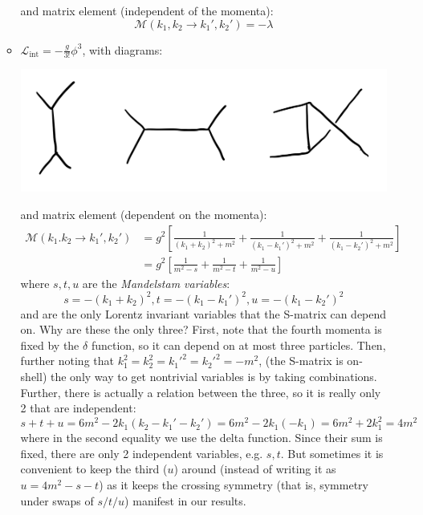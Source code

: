 \begin{itemize}
\begin{itemize}
\begin{center}
        \end{center}
        and matrix element (independent of the momenta):
        \begin{equation}
            \mathcal{M}(k_1, k_2 \to k_1', k_2') = -\lambda
        \end{equation}
        \item $\mathcal{L}_{\text{int}} = -\frac{g}{3!}\phi^3$, with diagrams:
        \begin{center}
            \includegraphics[scale=0.4]{Lectures/Figures/lec18-Ogsquared.png}
        \end{center}
        and matrix element (dependent on the momenta):
        \begin{equation}
            \begin{split}
                \mathcal{M}(k_1. k_2 \to k_1', k_2') &= g^2\left[\frac{1}{(k_1 + k_2)^2 + m^2} + \frac{1}{(k_1 - k_1')^2 + m^2} + \frac{1}{(k_1 - k_2')^2 + m^2}\right] 
                \\ &= g^2\left[\frac{1}{m^2 - s} + \frac{1}{m^2 - t} + \frac{1}{m^2 - u}\right]
            \end{split}
        \end{equation}
        where $s, t, u$ are the \emph{Mandelstam variables}:
        \begin{equation}
            s = -(k_1 + k_2)^2, t = -(k_1 - k_1')^2, u = -(k_1 - k_2')^2
        \end{equation}
        and are the only Lorentz invariant variables that the S-matrix can depend on. Why are these the only three? First, note that the fourth momenta is fixed by the $\delta$ function, so it can depend on at most three particles. Then, further noting that $k_1^2 = k_2^2 = k_1'^2 = k_2'^2 = -m^2$, (the S-matrix is on-shell) the only way to get nontrivial variables is by taking combinations. Further, there is actually a relation between the three, so it is really only 2 that are independent:
        \begin{equation}
            s + t + u = 6m^2 - 2k_1(k_2 - k_1' - k_2') = 6m^2 - 2k_1(-k_1) = 6m^2 + 2k_1^2 = 4m^2
        \end{equation}
        where in the second equality we use the delta function. Since their sum is fixed, there are only 2 independent variables, e.g. $s, t$. But sometimes it is convenient to keep the third ($u$) around (instead of writing it as $u = 4m^2 - s - t$) as it keeps the crossing symmetry (that is, symmetry under swaps of $s/t/u$) manifest in our results.
    \end{itemize}
\end{itemize}

